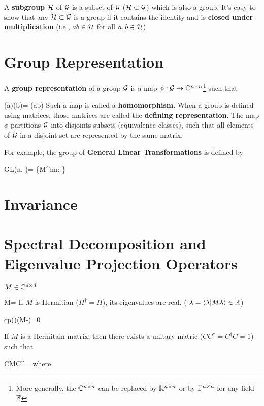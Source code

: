 A {\bf subgroup} ${\cal H}$ 
of ${\cal G}$
is a subset of ${\cal G}$
(${\cal H} \subset {\cal G}$)
which is also a group.
It's easy to show that any ${\cal H}\subset {\cal G}$ is a group if it
contains the identity
and is {\bf closed 
under multiplication} (i.e., $ab\in {\cal H}$ for all $a,b\in {\cal H}$) 

\section{Group  Representation}

A {\bf group representation}
of a group ${\cal G}$
is a map $\phi: {\cal G}\rightarrow { \mathbb{C}}^{n\times n}$\footnote{More generally, the ${ \mathbb{C}}^{n\times n}$ can be replaced by ${ \mathbb{R}}^{n\times n}$ or by ${ \mathbb{F}}^{n\times n}$ for any field ${ \mathbb{F}}$} such that

\beq
\phi(a)\phi(b)=
\phi(ab)
\eeq
Such a map is called a {\bf homomorphism}.
When a group is 
defined using matrices, those
matrices are called the {\bf defining representation}.
The map $\phi$ 
partitions ${\cal G}$
into disjoints subsets (equivalence classes),
such that all elements of ${\cal G}$ in a disjoint set 
are represented by the same matrix.


For example,
the group
of {\bf General Linear Transformations}
is defined by

\beq
GL(n, \CC)=
\{M\in \CC^{n\times n}: \}
\eeq

\section{Invariance}

\section{Spectral Decomposition and Eigenvalue Projection Operators}
\label{ch-spectral-decom}

$M\in { \mathbb{C}}^{d\times d }$

\beq
M=\lam {}
\eeq
If $M$ is Hermitian ($H^\dagger=H$), its eigenvalues are real. ( $\lambda =
\left\langle\lambda|M\lambda\right\rangle\in{ \mathbb{R}}$)


\beq
cp(\lam)\eqdef \det(M-\lam)=0
\eeq

If $M$ is a Hermitain  matrix, then there exists
a unitary matric ($CC^\dagger = C^\dagger C =1$)
such that

\beq
CMC^\dagger=
\eeq
where

